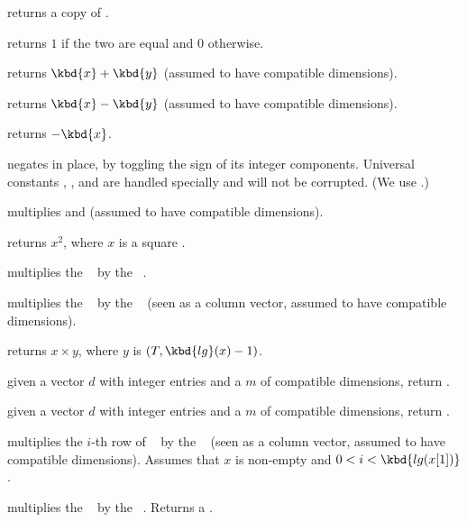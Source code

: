  returns a copy of .

 returns $1$ if the two  are equal
and $0$ otherwise.

 returns $\kbd{x} + \kbd{y}$ (assumed to have
compatible dimensions).

 returns $\kbd{x} - \kbd{y}$ (assumed to have
compatible dimensions).

 returns $-\kbd{x}$.

 negates  in place, by toggling the
sign of its integer components. Universal constants ,
,  and  are handled specially and will
not be corrupted. (We use .)

 multiplies  and  (assumed to
have compatible dimensions).

 returns $x^2$, where $x$ is a square .

 multiplies the ~
by the ~.

 multiplies the ~
by the ~ (seen as a column vector, assumed to have compatible
dimensions).

 returns $x \times y$, where $y$
is $(T, \kbd{lg}(x)-1)$.

 given a vector $d$ with integer entries
and a  $m$ of compatible dimensions, return .

 given a vector $d$ with integer entries
 and a  $m$ of compatible dimensions, return .




 multiplies the $i$-th row
of ~ by the ~ (seen as a column vector, assumed
to have compatible dimensions). Assumes that $x$ is non-empty and
$0 < i < \kbd{lg(x[1])}$.

 multiplies the ~
by the ~. Returns a .

